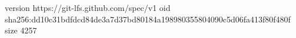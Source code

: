 version https://git-lfs.github.com/spec/v1
oid sha256:dd10c31bdfdcd84de3a7d37bd80184a198980355804090c5d06fa413f80f480f
size 4257
